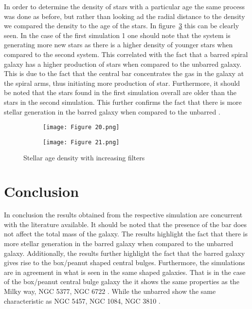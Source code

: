 \documentclass[12pt, a4paper]{article}
\begin{document}
In order to determine the density of stars with a particular age the same process was done as before, but rather than looking ad the radial distance to the density we compared the density to the age of the stars. In figure~\ref{fig:Age_denisty_combined} this can be clearly seen. In the case of the first simulation 1 one should note that the system is generating more new stars as there is a higher density of younger stars when compared to the second system. This correlated with the fact that a barred spiral galaxy has a higher production of stars when compared to the unbarred galaxy. This is due to the fact that the central bar concentrates the gas in the galaxy at the spiral arms, thus initiating more production of star. Furthermore, it should be noted that the stars found in the first simulation overall are older than the stars in the second simulation. This further confirms the fact that there is more stellar generation in the barred galaxy when compared to the unbarred \parencite{berghTenBillionYears2002}. 

\begin{figure}[H]
  \centering
  \begin{subfigure}{.5\textwidth}
    \centering
    \texttt{[image: Figure 20.png]}
    \label{fig:age_denisty_1}
  \end{subfigure}%
  \begin{subfigure}{.5\textwidth}
    \centering
    \texttt{[image: Figure 21.png]}
    \label{fig:age_denisty_2}
  \end{subfigure}
  \caption{Stellar age density with increasing filters}
  \label{fig:Age_denisty_combined}
\end{figure}

\section{Conclusion}
In conclusion the results obtained from the respective simulation are concurrent with the literature available. It should be noted that the presence of the bar does not affect the total mass of the galaxy. The results highlight the fact that there is more stellar generation in the barred galaxy when compared to the unbarred galaxy. Additionally, the results further highlight the fact that the barred galaxy gives rise to the box/peanut shaped central bulges. Furthermore, the simulations are in agreement in what is seen in the same shaped galaxies. That is in the case of the box/peanut central bulge galaxy the it shows the same properties as the Milky way, NGC 5377, NGC 6722 \parencite{BarredSpiral}. While the unbarred show the same characteristic as NGC 5457, NGC 1084, NGC 3810 \parencite{informationeso.orgNGC3810Pictureperfect}.
\end{document}
